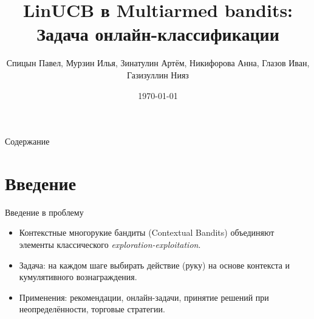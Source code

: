 \documentclass[10pt]{beamer}
\title{LinUCB в Multiarmed bandits:\\ Задача онлайн-классификации}
\author{Спицын Павел, Мурзин Илья, Зинатулин Артём, Никифорова Анна, Глазов Иван, Газизуллин Нияз}
\institute{Студкемп МФТИ x Яндекс}
\date{\today}
\begin{document}
\begin{frame}
  \titlepage
\end{frame}

\begin{frame}{Содержание}
  \tableofcontents
\end{frame}

\section{Введение}
\begin{frame}{Введение в проблему}
  \begin{itemize}
    \item Контекстные многорукие бандиты (Contextual Bandits) объединяют элементы классического \emph{exploration-exploitation}.
    \item Задача: на каждом шаге выбирать действие (руку) на основе контекста и кумулятивного вознаграждения.
    \item Применения: рекомендации, онлайн-задачи, принятие решений при неопределённости, торговые стратегии.
  \end{itemize}
\end{frame}
\end{document}
